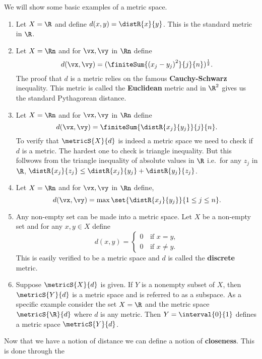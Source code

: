 \begin{Example}\label{ex:metric_space}
    We will show some basic examples of a metric space.
    \begin{enumerate}
	\item
	    Let $X = \R$ and define $d(x,y) = \distR{x}{y}$. This is the standard metric in $\R$.
	\item
	    Let $X = \Rn$ and for $\vx,\vy$ in $\Rn$ define 
	    \[d(\vx,\vy) = (\finiteSum{{(x_j - y_j)}^2}{j}{n})^{\frac{1}{2}}.\] 
	    The proof that $d$
	    is a metric relies on the famous \textbf{Cauchy-Schwarz} inequality. This metric is called the
	    \textbf{Euclidean} metric and in $\R^2$ gives us the standard Pythagorean distance.
	\item
	    Let $X = \Rn$ and for $\vx,\vy$ in $\Rn$ define
	    \[d(\vx,\vy) = \finiteSum{\distR{x_j}{y_j}}{j}{n}.\]
	    To verify that $\metricS{X}{d}$ is indeed a metric space we need to check if $d$ is a metric. The
	    hardest one to check is triangle inequality. But this follwows from the triangle inequality of
	    absolute values in $\R$ i.e.~for any $z_j$ in $\R$, $\distR{x_j}{z_j} \leq \distR{x_j}{y_j} +
	    \distR{y_j}{z_j}$. 
	\item
	    Let $X = \Rn$ and for $\vx,\vy$ in $\Rn$ define,
	    \[d(\vx,\vy) = \max\set{\distR{x_j}{y_j}}{1\leq j \leq n}.\]
	\item
	    Any non-empty set can be made into a metric space. Let $X$ be a non-empty set and for any $x,y \in
	    X$ define
	    \begin{equation*}
		d(x,y) = 
		\begin{cases}
		    0 &\,\text{if $x = y$},\\
		    0 &\, \text{if $x \neq y$}.
		\end{cases}
	    \end{equation*}
	    This is easily verified to be a metric space and $d$ is called the \textbf{discrete} metric.
	\item
	    Suppose $\metricS{X}{d}$ is given. If $Y$ is a nonempty subset of $X$, then $\metricS{Y}{d}$ is a
	    metric space and is referred to as a subspace. As a specific example consider the set $X=\R$ and
	    the metric space $\metricS{\R}{d}$ where $d$ is any metric. Then $Y = \interval{0}{1}$ defines a 
	    metric space $\metricS{Y}{d}$.
    \end{enumerate} 
\end{Example}
Now that we have a notion of distance we can define a notion of \textbf{closeness}. This is done through the
